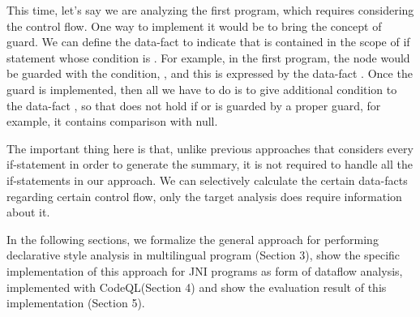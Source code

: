 This time, let's say we are analyzing the first program, which requires
considering the control flow.  One way to implement it would be to bring the
concept of guard. We can define the data-fact  to
indicate that  is contained in the scope of if statement whose
condition is .  For example, in the first program, the
 node would be guarded with the condition, ,
and this is expressed by the data-fact .
Once the guard is implemented, then all we have to do is to give additional
condition to the data-fact , so that  does not
hold if  or  is guarded by a proper guard, for example,
it contains comparison with null.

The important thing here is that, unlike previous approaches that considers
every if-statement in order to generate the summary, it is not required to
handle all the if-statements in our approach. We can selectively calculate the
certain data-facts regarding certain control flow, only the target analysis
does require information about it.

In the following sections, we formalize the general approach for performing
declarative style analysis in multilingual program (Section 3), show the
specific implementation of this approach for JNI programs as form of dataflow
analysis, implemented with CodeQL(Section 4) and show the evaluation result of
this implementation (Section 5).
